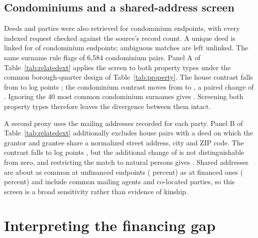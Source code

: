 \documentclass[12pt]{article}
\begin{document}
\subsection{Condominiums and a shared-address screen}
Deeds and parties were also retrieved for condominium endpoints, with every indexed request checked against the source's record count. A unique deed is linked for \CondoDeedEnds{} of \CondoEnds{} condominium endpoints; \CondoAmbiguous{} ambiguous matches are left unlinked. The same surname rule flags \CondoFlagged{} of 6,584 condominium pairs. Panel A of Table~\ref{tab:relatedext} applies the screen to both property types under the common borough-quarter design of Table~\ref{tab:property}. The house contrast falls from \InitialGap{} to \HouseBQNoRel{} log points \HouseBQNoRelCI{}; the condominium contrast moves from \CondoGap{} \CondoBootCI{} to \CondoNoRel{} \CondoNoRelCI{}, a paired change of \CondoRelChange{} \CondoRelChangeCI{}. Ignoring the 40 most common condominium surnames gives \CondoNoRelStrict{} \CondoNoRelStrictCI{}. Screening both property types therefore leaves the divergence between them intact.

A second proxy uses the mailing addresses recorded for each party. Panel B of Table~\ref{tab:relatedext} additionally excludes \AddrPairs{} house pairs with a deed on which the grantor and grantee share a normalized street address, city and ZIP code. The contrast falls to \AddrOLS{} log points \AddrOLSCI{}, but the additional change of \AddrChange{} \AddrChangeCI{} is not distinguishable from zero, and restricting the match to natural persons gives \AddrPersonOLS{} \AddrPersonOLSCI{}. Shared addresses are about as common at unfinanced endpoints (\AddrShareCash{} percent) as at financed ones (\AddrShareFin{} percent) and include common mailing agents and co-located parties, so this screen is a broad sensitivity rather than evidence of kinship.


\section{Interpreting the financing gap}
\end{document}
